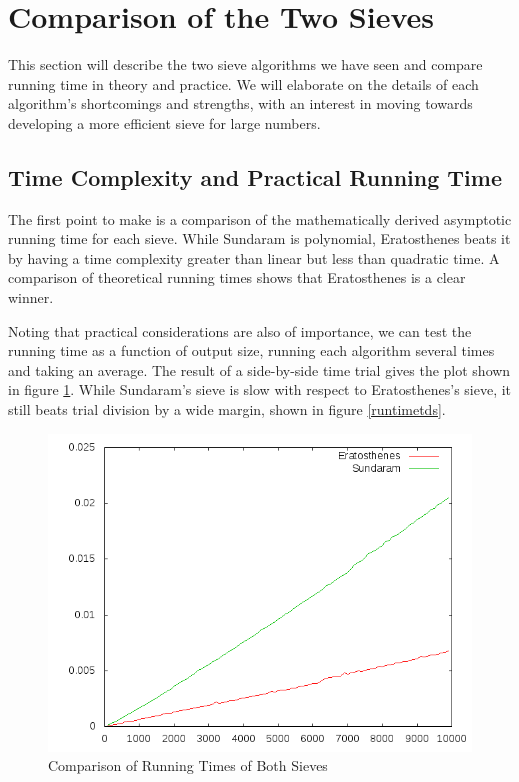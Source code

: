 \documentclass{amsart}
\theoremstyle{definition}
\theoremstyle{case}
\begin{document}
	\section{Comparison of the Two Sieves}
	
	This section will describe the two sieve algorithms we have seen and compare running time in theory and practice. We will elaborate on the details of each algorithm's shortcomings and strengths, with an interest in moving towards developing a more efficient sieve for large numbers.
	
	\subsection{Time Complexity and Practical Running Time}
	The first point to make is a comparison of the mathematically derived asymptotic running time for each sieve. While Sundaram is polynomial, Eratosthenes beats it by having a time complexity greater than linear but less than quadratic time. A comparison of theoretical running times shows that Eratosthenes is a clear winner.
	
	Noting that practical considerations are also of importance, we can test the running time as a function of output size, running each algorithm several times and taking an average. The result of a side-by-side time trial gives the plot shown in figure \ref{runtimevs}. While Sundaram's sieve is slow with respect to Eratosthenes's sieve, it still beats trial division by a wide margin, shown in figure \ref{runtimetds}.
	
	\begin{figure}\caption{Comparison of Running Times of Both Sieves}
		\label{runtimevs}
		\includegraphics[scale=0.5]{both1.png}
	\end{figure}
	
\end{document}
